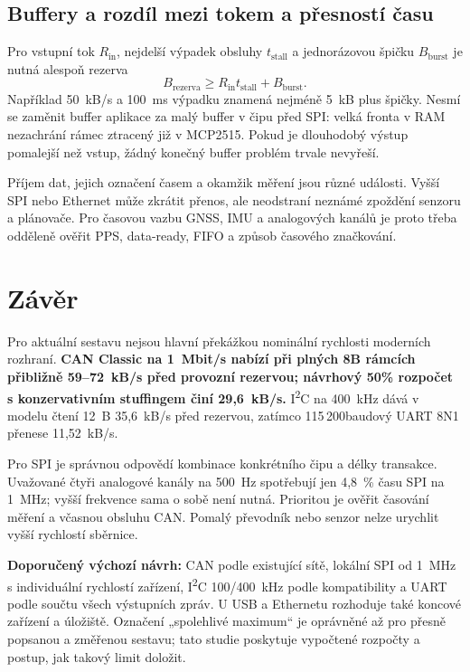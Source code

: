 \documentclass[11pt,a4paper]{article}
\begin{document}
\subsection{Buffery a rozdíl mezi tokem a přesností času}
Pro vstupní tok $R_{\mathrm{in}}$, nejdelší výpadek obsluhy $t_{\mathrm{stall}}$ a jednorázovou špičku $B_{\mathrm{burst}}$ je nutná alespoň rezerva
\begin{equation}
B_{\mathrm{rezerva}}\ge R_{\mathrm{in}}t_{\mathrm{stall}}+B_{\mathrm{burst}}.
\end{equation}
Například 50~kB/s a 100~ms výpadku znamená nejméně 5~kB plus špičky. Nesmí se zaměnit buffer aplikace za malý buffer v čipu před SPI: velká fronta v RAM nezachrání rámec ztracený již v MCP2515. Pokud je dlouhodobý výstup pomalejší než vstup, žádný konečný buffer problém trvale nevyřeší.

Příjem dat, jejich označení časem a okamžik měření jsou různé události. Vyšší SPI nebo Ethernet může zkrátit přenos, ale neodstraní neznámé zpoždění senzoru a plánovače. Pro časovou vazbu GNSS, IMU a analogových kanálů je proto třeba odděleně ověřit PPS, data-ready, FIFO a způsob časového značkování.

\section{Závěr}
Pro aktuální sestavu nejsou hlavní překážkou nominální rychlosti moderních rozhraní. \textbf{CAN Classic na 1~Mbit/s nabízí při plných 8B rámcích přibližně 59--72~kB/s před provozní rezervou; návrhový 50\% rozpočet s konzervativním stuffingem činí 29,6~kB/s.} I\textsuperscript{2}C na 400~kHz dává v modelu čtení 12~B 35,6~kB/s před rezervou, zatímco 115\,200baudový UART 8N1 přenese 11,52~kB/s.

Pro SPI je správnou odpovědí kombinace konkrétního čipu a délky transakce. Uvažované čtyři analogové kanály na 500~Hz spotřebují jen 4,8~\% času SPI na 1~MHz; vyšší frekvence sama o sobě není nutná. Prioritou je ověřit časování měření a včasnou obsluhu CAN. Pomalý převodník nebo senzor nelze urychlit vyšší rychlostí sběrnice.

\textbf{Doporučený výchozí návrh:} CAN podle existující sítě, lokální SPI od 1~MHz s individuální rychlostí zařízení, I\textsuperscript{2}C 100/400~kHz podle kompatibility a UART podle součtu všech výstupních zpráv. U USB a Ethernetu rozhoduje také koncové zařízení a úložiště. Označení „spolehlivé maximum“ je oprávněné až pro přesně popsanou a změřenou sestavu; tato studie poskytuje vypočtené rozpočty a postup, jak takový limit doložit.
\end{document}
